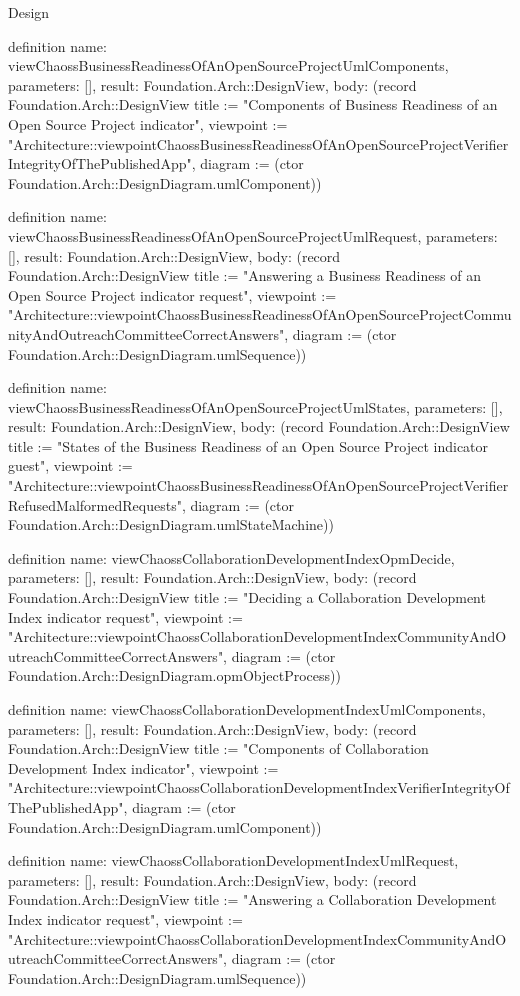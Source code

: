 \begin{lexlean}{Design}
\begin{semanticmodule}
definition{
  name: viewChaossBusinessReadinessOfAnOpenSourceProjectUmlComponents,
  parameters: [],
  result: Foundation.Arch::DesignView,
  body: (record Foundation.Arch::DesignView {title := "Components of Business Readiness of an Open Source Project indicator", viewpoint := "Architecture::viewpointChaossBusinessReadinessOfAnOpenSourceProjectVerifierIntegrityOfThePublishedApp", diagram := (ctor Foundation.Arch::DesignDiagram.umlComponent)})
}

definition{
  name: viewChaossBusinessReadinessOfAnOpenSourceProjectUmlRequest,
  parameters: [],
  result: Foundation.Arch::DesignView,
  body: (record Foundation.Arch::DesignView {title := "Answering a Business Readiness of an Open Source Project indicator request", viewpoint := "Architecture::viewpointChaossBusinessReadinessOfAnOpenSourceProjectCommunityAndOutreachCommitteeCorrectAnswers", diagram := (ctor Foundation.Arch::DesignDiagram.umlSequence)})
}

definition{
  name: viewChaossBusinessReadinessOfAnOpenSourceProjectUmlStates,
  parameters: [],
  result: Foundation.Arch::DesignView,
  body: (record Foundation.Arch::DesignView {title := "States of the Business Readiness of an Open Source Project indicator guest", viewpoint := "Architecture::viewpointChaossBusinessReadinessOfAnOpenSourceProjectVerifierRefusedMalformedRequests", diagram := (ctor Foundation.Arch::DesignDiagram.umlStateMachine)})
}

definition{
  name: viewChaossCollaborationDevelopmentIndexOpmDecide,
  parameters: [],
  result: Foundation.Arch::DesignView,
  body: (record Foundation.Arch::DesignView {title := "Deciding a Collaboration Development Index indicator request", viewpoint := "Architecture::viewpointChaossCollaborationDevelopmentIndexCommunityAndOutreachCommitteeCorrectAnswers", diagram := (ctor Foundation.Arch::DesignDiagram.opmObjectProcess)})
}

definition{
  name: viewChaossCollaborationDevelopmentIndexUmlComponents,
  parameters: [],
  result: Foundation.Arch::DesignView,
  body: (record Foundation.Arch::DesignView {title := "Components of Collaboration Development Index indicator", viewpoint := "Architecture::viewpointChaossCollaborationDevelopmentIndexVerifierIntegrityOfThePublishedApp", diagram := (ctor Foundation.Arch::DesignDiagram.umlComponent)})
}

definition{
  name: viewChaossCollaborationDevelopmentIndexUmlRequest,
  parameters: [],
  result: Foundation.Arch::DesignView,
  body: (record Foundation.Arch::DesignView {title := "Answering a Collaboration Development Index indicator request", viewpoint := "Architecture::viewpointChaossCollaborationDevelopmentIndexCommunityAndOutreachCommitteeCorrectAnswers", diagram := (ctor Foundation.Arch::DesignDiagram.umlSequence)})
}


\end{semanticmodule}
\end{lexlean}
